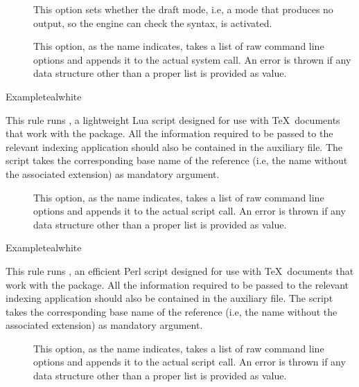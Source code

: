 \begin{description}
\begin{description}
\item[] This option sets whether the draft mode, i.e, a mode that produces no output, so the engine can check the syntax, is activated.

\item[] This option, as the name indicates, takes a list of raw command line options and appends it to the actual system call. An error is thrown if any data structure other than a proper list is provided as value.
\end{description}

\begin{codebox}{Example}{teal}{\icnote}{white}
\end{codebox}

\item[\rulebox{makeglossarieslite}{Marco Daniel, Nicola Talbot, Paulo Cereda}] This rule runs , a lightweight Lua script designed for use with \TeX\ documents that work with the  package. All the information required to be passed to the relevant indexing application should also be contained in the auxiliary file. The script takes the corresponding base name of the  reference (i.e, the name without the associated extension) as mandatory argument.

\begin{description}
\item[] This option, as the name indicates, takes a list of raw command line options and appends it to the actual script call. An error is thrown if any data structure other than a proper list is provided as value.
\end{description}

\begin{codebox}{Example}{teal}{\icnote}{white}
\end{codebox}

\item[\rulebox{makeglossaries}{Marco Daniel, Nicola Talbot, Paulo Cereda}] This rule runs , an efficient Perl script designed for use with \TeX\ documents that work with the  package. All the information required to be passed to the relevant indexing application should also be contained in the auxiliary file. The script takes the corresponding base name of the  reference (i.e, the name without the associated extension) as mandatory argument.

\begin{description}
\item[] This option, as the name indicates, takes a list of raw command line options and appends it to the actual script call. An error is thrown if any data structure other than a proper list is provided as value.
\end{description}


\end{description}

